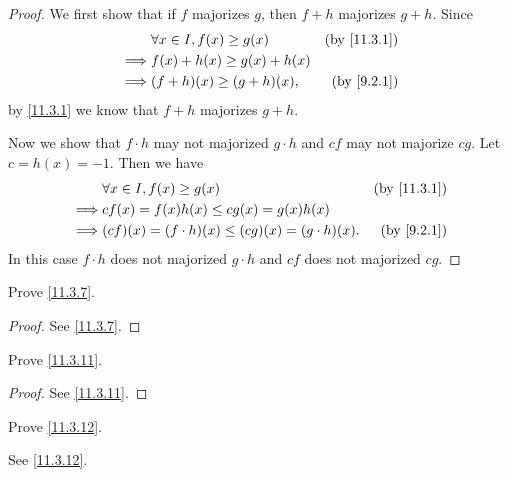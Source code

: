 \begin{proof}
  We first show that if \(f\) majorizes \(g\), then \(f + h\) majorizes \(g + h\).
  Since
  \begin{align*}
             & \forall x \in I, f(x) \geq g(x) & \text{(by \cref{11.3.1})} \\
    \implies & f(x) + h(x) \geq g(x) + h(x)                                \\
    \implies & (f + h)(x) \geq (g + h)(x),     & \text{(by \cref{9.2.1})}
  \end{align*}
  by \cref{11.3.1} we know that \(f + h\) majorizes \(g + h\).

  Now we show that \(f \cdot h\) may not majorized \(g \cdot h\) and \(cf\) may not majorize \(cg\).
  Let \(c = h(x) = -1\).
  Then we have
  \begin{align*}
             & \forall x \in I, f(x) \geq g(x)                         & \text{(by \cref{11.3.1})} \\
    \implies & cf(x) = f(x) h(x) \leq cg(x) = g(x) h(x)                                            \\
    \implies & (cf)(x) = (f \cdot h)(x) \leq (cg)(x) = (g \cdot h)(x). & \text{(by \cref{9.2.1})}
  \end{align*}
  In this case \(f \cdot h\) does not majorized \(g \cdot h\) and \(cf\) does not majorized \(cg\).
\end{proof}

\begin{ex}\label{ex:11.3.3}
  Prove \cref{11.3.7}.
\end{ex}

\begin{proof}
  See \cref{11.3.7}.
\end{proof}

\begin{ex}\label{ex:11.3.4}
  Prove \cref{11.3.11}.
\end{ex}

\begin{proof}
  See \cref{11.3.11}.
\end{proof}

\begin{ex}\label{ex:11.3.5}
  Prove \cref{11.3.12}.
\end{ex}

\begin{prop}
  See \cref{11.3.12}.
\end{prop}
